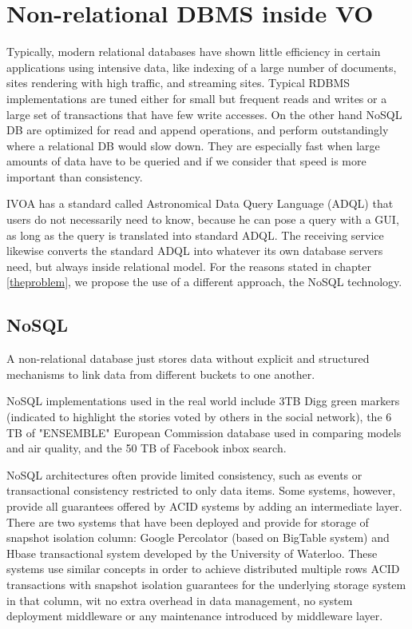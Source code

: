 \chapter{Non-relational DBMS inside VO}

Typically, modern relational databases have shown little efficiency in certain applications using intensive data, like indexing of a large number of documents, sites rendering with high traffic, and streaming sites. Typical RDBMS implementations are tuned either for small but frequent reads and writes or a large set of transactions that have few write accesses. On the other hand NoSQL DB are optimized for read and append operations, and perform outstandingly where a relational DB would slow down. They are especially fast when large amounts of data have to be queried and if we consider that speed is more important than consistency. \newline

IVOA has a standard called Astronomical Data Query Language (ADQL) that users do not necessarily need to know, because he can pose a query with a GUI, as long as the query is translated into standard ADQL. The receiving service likewise converts the standard ADQL into whatever its own database servers need, but always inside relational model. For the reasons stated in chapter \ref{theproblem}, we propose the use of a different approach, the NoSQL technology.


\section{NoSQL}

A non-relational database just stores data without explicit and structured mechanisms to link data from different buckets to one another. \newline

NoSQL implementations used in the real world include 3TB Digg green markers (indicated to highlight the stories voted by others in the social network), the 6 TB of "ENSEMBLE" European Commission database used in comparing models and air quality, and the 50 TB of Facebook inbox search. \newline

NoSQL architectures often provide limited consistency, such as events or transactional consistency restricted to only data items. Some systems, however, provide all guarantees offered by ACID systems by adding an intermediate layer. There are two systems that have been deployed and provide for storage of snapshot isolation column: Google Percolator (based on BigTable system) and Hbase transactional system developed by the University of Waterloo. These systems use similar concepts in order to achieve distributed multiple rows ACID transactions with snapshot isolation guarantees for the underlying storage system in that column, wit no extra overhead in data management, no system deployment middleware or any maintenance introduced by middleware layer. \newline

